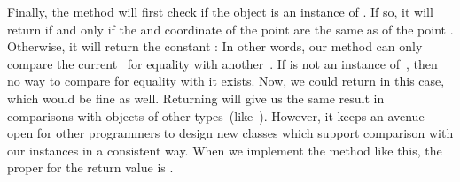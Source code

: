 Finally, the  method will first check if the  object is an instance of .
If so, it will return  if and only if the  and  coordinate of the  point are the same as of the point .
Otherwise, it will return the constant :%
%
%
%
In other words, our  method can only compare the current~ for equality with another~.
If  is not an instance of~, then no way to compare for equality with it exists.
Now, we could return  in this case, which would be fine as well.
Returning  will give us the same result in comparisons with objects of other types~(like~).
However, it keeps an avenue open for other programmers to design new classes which support comparison with our  instances in a consistent way.
When we implement the  method like this, the proper  for the return value is .


